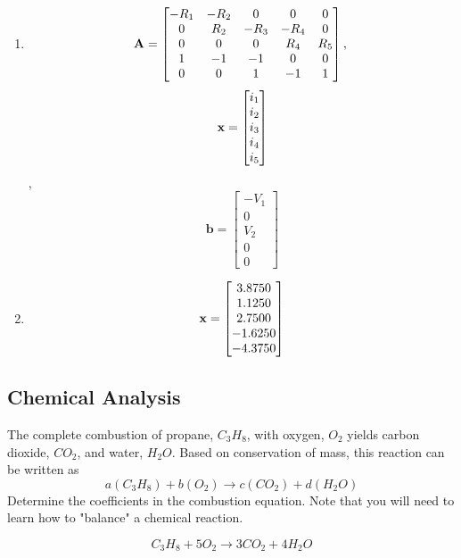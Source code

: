 \begin{sol}
\begin{enumerate}
    \item  $$\mathbf{A} = \begin{bmatrix}
-R_{1} & -R_{2} & 0 & 0 & 0\\
0 & R_{2} & -R_{3} & -R_{4} & 0\\
0 & 0 & 0 & R_{4} & R_{5}\\
1 & -1 & -1 & 0 & 0\\
0 & 0 & 1 & -1 & 1\\
    \end{bmatrix}, \;$$
    $$\mathbf{x} = \begin{bmatrix} i_1 \\ i_2 \\ i_3 \\ i_4 \\ i_5 \end{bmatrix}$$, \;
    $$\mathbf{b} = \begin{bmatrix} -V_{1} \\ 0 \\ V_{2} \\ 0 \\ 0  \end{bmatrix}$$
    \item $$\mathbf{x} =\begin{bmatrix}
 3.8750\\
    1.1250\\
    2.7500\\
   -1.6250\\
   -4.3750
\end{bmatrix}$$
\end{enumerate}
\end{sol}

\subsection{Chemical Analysis}

\begin{prob}
The complete combustion of propane, $C_3H_8$, with oxygen, $O_2$ yields carbon dioxide, $CO_2$, and water, $H_2O$. Based on conservation of mass, this reaction can be written as
\[a(C_3H_8) + b(O_2) \rightarrow c(CO_2) + d(H_2O)\]
Determine the coefficients in the combustion equation. Note that you will need to learn how to "balance" a chemical reaction.
\end{prob}
\begin{sol}
\[C_3H_8 + 5O_2 \longrightarrow 3CO_2 + 4H_2O\]
\end{sol}

